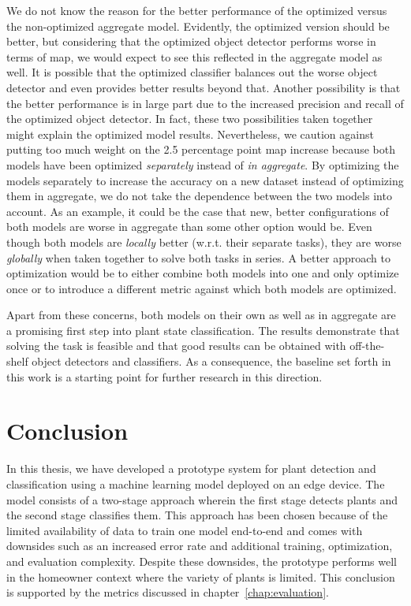 \documentclass[final]{vutinfth} %
\begin{document}
We do not know the reason for the better performance of the optimized
versus the non-optimized aggregate model. Evidently, the optimized
version should be better, but considering that the optimized object
detector performs worse in terms of \gls{map}, we would expect to see
this reflected in the aggregate model as well. It is possible that the
optimized classifier balances out the worse object detector and even
provides better results beyond that. Another possibility is that the
better performance is in large part due to the increased precision and
recall of the optimized object detector. In fact, these two
possibilities taken together might explain the optimized model
results. Nevertheless, we caution against putting too much weight on
the \num{2.5} percentage point \gls{map} increase because both models
have been optimized \emph{separately} instead of \emph{in
aggregate}. By optimizing the models separately to increase the
accuracy on a new dataset instead of optimizing them in aggregate, we
do not take the dependence between the two models into account. As an
example, it could be the case that new, better configurations of both
models are worse in aggregate than some other option would be. Even
though both models are \emph{locally} better (w.r.t. their separate
tasks), they are worse \emph{globally} when taken together to solve
both tasks in series. A better approach to optimization would be to
either combine both models into one and only optimize once or to
introduce a different metric against which both models are optimized.

Apart from these concerns, both models on their own as well as in
aggregate are a promising first step into plant state
classification. The results demonstrate that solving the task is
feasible and that good results can be obtained with off-the-shelf
object detectors and classifiers. As a consequence, the baseline set
forth in this work is a starting point for further research in this
direction.

\chapter{Conclusion}
\label{chap:conclusion}

In this thesis, we have developed a prototype system for plant
detection and classification using a machine learning model deployed
on an edge device. The model consists of a two-stage approach wherein
the first stage detects plants and the second stage classifies
them. This approach has been chosen because of the limited
availability of data to train one model end-to-end and comes with
downsides such as an increased error rate and additional training,
optimization, and evaluation complexity. Despite these downsides, the
prototype performs well in the homeowner context where the variety of
plants is limited. This conclusion is supported by the metrics
discussed in chapter~\ref{chap:evaluation}.
\end{document}
